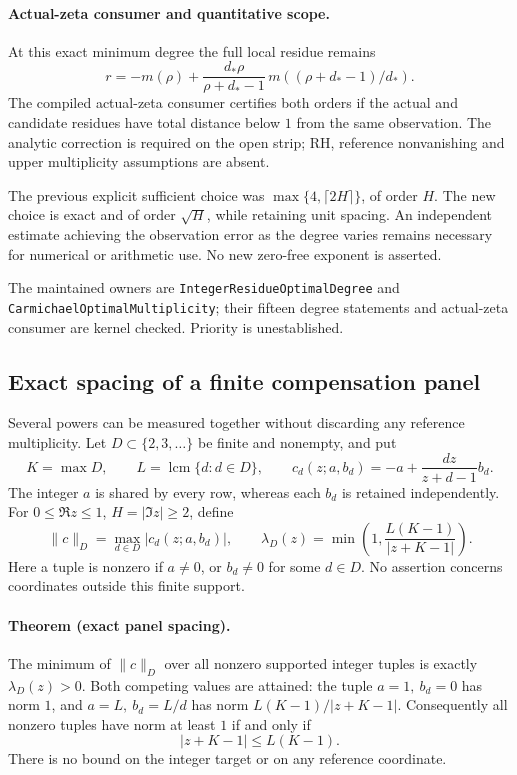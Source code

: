 \paragraph{Actual-zeta consumer and quantitative scope.}
At this exact minimum degree the full local residue remains
\[
 r=-m(\rho)+\frac{d_*\rho}{\rho+d_*-1}\,
            m((\rho+d_*-1)/d_*).
\]
The compiled actual-zeta consumer certifies both orders if the actual
and candidate residues have total distance below \(1\) from the same
observation. The analytic correction is required on the open strip;
RH, reference nonvanishing and upper multiplicity assumptions are absent.

The previous explicit sufficient choice was
\(\max\{4,\lceil2H\rceil\}\), of order \(H\).
The new choice is exact and of order \(\sqrt H\), while retaining
unit spacing. An independent estimate achieving the observation error
as the degree varies remains necessary for numerical or arithmetic use.
No new zero-free exponent is asserted.

The maintained owners are \texttt{IntegerResidueOptimalDegree} and
\texttt{CarmichaelOptimalMultiplicity}; their fifteen degree statements
and actual-zeta consumer are kernel checked. Priority is unestablished.

\subsection{Exact spacing of a finite compensation panel}
\label{sec:residue-panel-spacing}

Several powers can be measured together without discarding any reference
multiplicity. Let \(D\subset\{2,3,\ldots\}\) be finite and nonempty, and put
\[
 K=\max D,\qquad L=\operatorname{lcm}\{d:d\in D\},\qquad
 c_d(z;a,b_d)=-a+\frac{dz}{z+d-1}b_d.
\]
The integer \(a\) is shared by every row, whereas each \(b_d\) is retained
independently. For \(0\le\Re z\le1\), \(H=|\Im z|\ge2\), define
\[
 \|c\|_D=\max_{d\in D}|c_d(z;a,b_d)|,\qquad
 \lambda_D(z)=\min\left(1,\frac{L(K-1)}{|z+K-1|}\right).
\]
Here a tuple is nonzero if \(a\ne0\), or \(b_d\ne0\) for some \(d\in D\).
No assertion concerns coordinates outside this finite support.

\paragraph{Theorem (exact panel spacing).}
The minimum of \(\|c\|_D\) over all nonzero supported integer tuples is
exactly \(\lambda_D(z)>0\). Both competing values are attained: the tuple
\(a=1,\ b_d=0\) has norm \(1\), and
\(a=L,\ b_d=L/d\) has norm \(L(K-1)/|z+K-1|\).
Consequently all nonzero tuples have norm at least \(1\) if and only if
\[
 |z+K-1|\le L(K-1).
\]
There is no bound on the integer target or on any reference coordinate.

